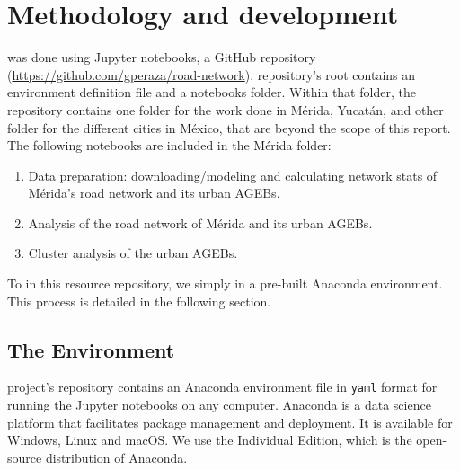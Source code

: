 \chapter{Methodology and development}
\label{cha:chapter3}


 was done using Jupyter notebooks,   a GitHub repository (\url{https://github.com/gperaza/road-network}).  repository's root contains an environment definition file and a notebooks folder. Within that folder, the repository contains one folder for the work done in Mérida, Yucatán, and other folder for the different cities in México, that are beyond the scope of this report. The following notebooks  are included in the Mérida folder:

\begin{enumerate}
\item Data preparation: downloading/modeling and calculating network stats of Mérida's road network and its urban AGEBs.
\item Analysis of the road network of Mérida and its urban AGEBs.
\item Cluster analysis of the urban AGEBs.
\end{enumerate}

To  in this resource repository, we simply  in a pre-built Anaconda environment. This process is detailed in the following section.

\section{The Environment}

 project's repository contains an Anaconda environment file in \verb|yaml| format for running the Jupyter notebooks on any computer. Anaconda \cite{anaconda} is a data science platform that facilitates package management and deployment. It is available for Windows, Linux and macOS. We use the Individual Edition, which is the open-source distribution of Anaconda.

